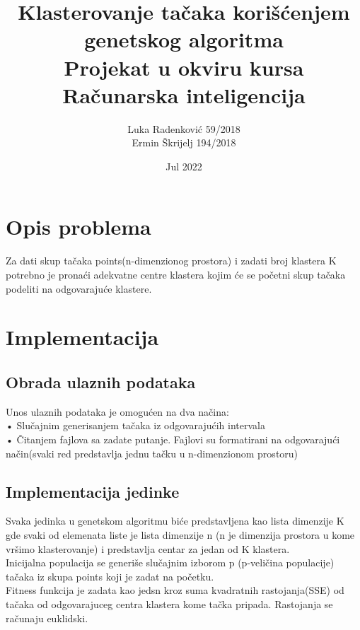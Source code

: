 \documentclass[]{article}
\title{Klasterovanje tačaka korišćenjem 
	genetskog algoritma \vspace{0.5cm} \\ 
	\large Projekat u okviru kursa Računarska inteligencija \vspace{6cm}}
\author{Luka Radenković 59/2018 \\
	Ermin Škrijelj 194/2018}
\date{Jul 2022}
\begin{document}
\maketitle

\newpage

\renewcommand*\contentsname{Sadržaj}
\tableofcontents
\newpage

	\section{Opis problema}
	Za dati skup ta\v{c}aka points(n-dimenzionog prostora) i zadati broj klastera K potrebno je pronaći adekvatne centre klastera  kojim \'{c}e se po\v{c}etni skup ta\v{c}aka podeliti na odgovaraju\'{c}e klastere.
	
	\section{Implementacija}
	
	\subsection{Obrada ulaznih podataka}
	Unos ulaznih podataka je omogu\'{c}en na dva na\v{c}ina:\\ 
	\-\quad • Slu\v{c}ajnim generisanjem tačaka iz odgovaraju\'{c}ih intervala\\
	\-\quad • \v{C}itanjem fajlova sa zadate putanje. Fajlovi su formatirani na odgovaraju\'{c}i \\ \-\qquad na\v{c}in(svaki red predstavlja jednu tačku u n-dimenzionom prostoru) \vspace{0.5cm} \\
	\subsection{Implementacija jedinke}
	Svaka jedinka u genetskom algoritmu bi\'{c}e predstavljena kao lista dimenzije K gde svaki od elemenata liste je lista dimenzije n
	(n je dimenzija prostora u kome vr\v{s}imo klasterovanje) i predstavlja centar za jedan od K klastera. \vspace{0.5cm} \\
	Inicijalna populacija se generi\v{s}e slu\v{c}ajnim izborom p (p-veličina populacije) ta\v{c}aka iz skupa points koji je zadat na po\v{c}etku. \vspace{0.5cm} \\
	Fitness funkcija je zadata kao jedsn kroz suma kvadratnih rastojanja(SSE) od ta\v{c}aka od odgovarajuceg centra klastera kome ta\v{c}ka pripada.
	Rastojanja se ra\v{c}unaju euklidski.\\
	
\end{document}
